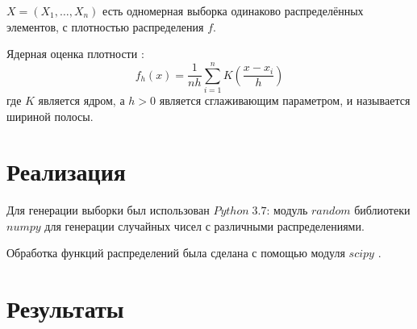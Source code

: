 \documentclass[a4]{article}
\begin{document}
$X = \left(X_1,\ldots, X_n\right)$ есть одномерная выборка одинаково распределённых элементов, с плотностью распределения $f.$

Ядерная оценка плотности \cite{art}:
\begin{equation}
    f_h(x) = \frac{1}{nh}\sum\limits_{i=1}^nK\left(\frac{x-x_i}{h}\right)\label{eqn:art}
\end{equation}
где $K$ является ядром, а $h>0$ является сглаживающим параметром, и называется шириной полосы.

\section{Реализация}
Для генерации выборки был использован $Python\;3.7$: модуль $random$ библиотеки $numpy$ \cite{numpy} для генерации случайных чисел с различными распределениями. 

Обработка функций распределений была сделана с помощью модуля $scipy$ \cite{skp}.

\newpage
\section{Результаты}
\end{document}
